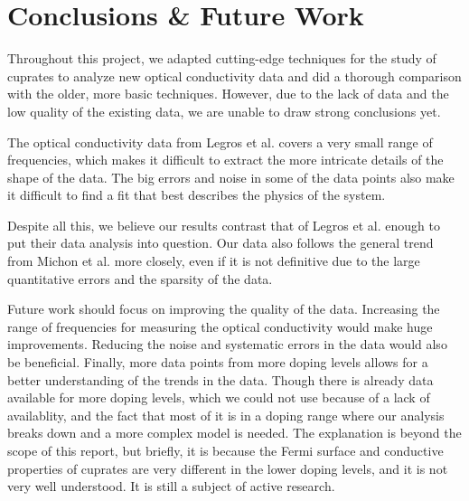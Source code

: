 \newpage
\section{Conclusions \& Future Work}
Throughout this project, we adapted cutting-edge techniques for the study of cuprates to analyze
new optical conductivity data and did a thorough comparison with the older, more basic techniques.
However, due to the lack of data and the low quality of the existing data, we are unable to draw
strong conclusions yet.

The optical conductivity data from Legros et al. covers a very small range of frequencies, which
makes it difficult to extract the more intricate details of the shape of the data. The big errors
and noise in some of the data points also make it difficult to find a fit that best describes the
physics of the system.

Despite all this, we believe our results contrast that of Legros et al. enough to put their data
analysis into question. Our data also follows the general trend from Michon et al. more closely,
even if it is not definitive due to the large quantitative errors and the sparsity of the data.

Future work should focus on improving the quality of the data. Increasing the range of frequencies
for measuring the optical conductivity would make huge improvements. Reducing the noise and
systematic errors in the data would also be beneficial. Finally, more data points from more
doping levels allows for a better understanding of the trends in the data. Though there is already
data available for more doping levels, which we could not use because of a lack of availablity, and
the fact that most of it is in a doping range where our analysis breaks down and a more complex
model is needed. The explanation is beyond the scope of this report, but briefly, it is because the
Fermi surface and conductive properties of cuprates are very different in the lower doping levels,
and it is not very well understood. It is still a subject of active research.
\newpage